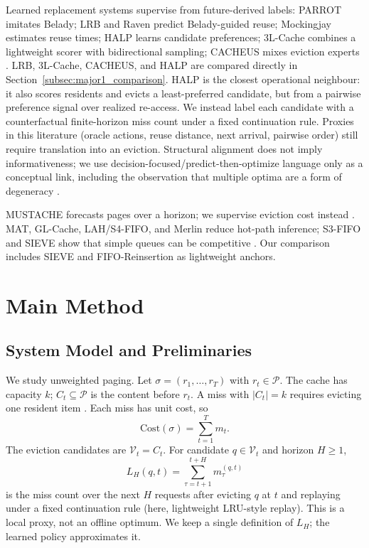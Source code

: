 \documentclass[preprint,12pt]{elsarticle}
\begin{document}
Learned replacement systems supervise from future-derived labels: PARROT imitates Belady; LRB and Raven predict Belady-guided reuse; Mockingjay estimates reuse times; HALP learns candidate preferences; 3L-Cache combines a lightweight scorer with bidirectional sampling; CACHEUS mixes eviction experts \cite{liu2020parrot,song2020lrb,hu2022raven,shah2022mockingjay,song2023halp,zhou2025threelcache,rodriguez2021cacheus}. LRB, 3L-Cache, CACHEUS, and HALP are compared directly in Section~\ref{subsec:major1_comparison}. HALP is the closest operational neighbour: it also scores residents and evicts a least-preferred candidate, but from a pairwise preference signal over realized re-access. We instead label each candidate with a counterfactual finite-horizon miss count under a fixed continuation rule. Proxies in this literature (oracle actions, reuse distance, next arrival, pairwise order) still require translation into an eviction. Structural alignment does not imply informativeness; we use decision-focused/predict-then-optimize language only as a conceptual link, including the observation that multiple optima are a form of degeneracy \cite{elmachtoub2022smart_predict_optimize,wilder2019decision_focused_learning,shah2022lodl,elbalghiti2022generalization}.

MUSTACHE forecasts pages over a horizon; we supervise eviction cost instead \cite{tolomei2022mustache}. MAT, GL-Cache, LAH/S4-FIFO, and Merlin reduce hot-path inference; S3-FIFO and SIEVE show that simple queues can be competitive \cite{yang2023mat,yang2023glcache,xia2026lah,li2026merlin,yang2023s3fifo,zhang2024sieve}. Our comparison includes SIEVE and FIFO-Reinsertion as lightweight anchors.

\section{Main Method}
\label{sec:method}

\subsection{System Model and Preliminaries}
\label{subsec:system_model}

We study unweighted paging. Let $\sigma=(r_1,\ldots,r_T)$ with $r_t\in\mathcal{P}$. The cache has capacity $k$; $C_t\subseteq\mathcal{P}$ is the content before $r_t$. A miss with $|C_t|=k$ requires evicting one resident item \cite{belady1966replacement_algorithms,fiat1991competitive_paging}. Each miss has unit cost, so
\begin{equation}
\mathrm{Cost}(\sigma)=\sum_{t=1}^{T} m_t.
\label{eq:total-cost}
\end{equation}
The eviction candidates are $\mathcal{V}_t=C_t$. For candidate $q\in\mathcal{V}_t$ and horizon $H\geq 1$,
\begin{equation}
L_H(q,t)=\sum_{\tau=t+1}^{t+H} m_{\tau}^{(q,t)}
\label{eq:eviction_loss}
\end{equation}
is the miss count over the next $H$ requests after evicting $q$ at $t$ and replaying under a fixed continuation rule (here, lightweight LRU-style replay). This is a local proxy, not an offline optimum. We keep a single definition of $L_H$; the learned policy approximates it.
\end{document}
